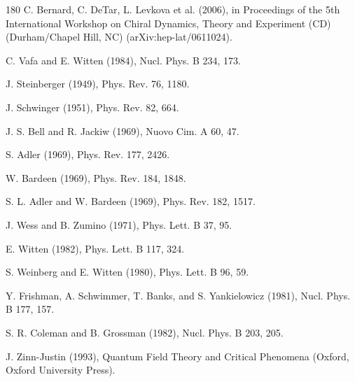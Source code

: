 \begin{thebibliography}{180}
 C. Bernard, C. DeTar, L. Levkova et al. (2006), in Proceedings of the 5th International Workshop on Chiral Dynamics, Theory and Experiment (CD) (Durham/Chapel Hill, NC) (arXiv:hep-lat/0611024).

 C. Vafa and E. Witten (1984), Nucl. Phys. B 234, 173.

 J. Steinberger (1949), Phys. Rev. 76, 1180.

 J. Schwinger (1951), Phys. Rev. 82, 664.

 J. S. Bell and R. Jackiw (1969), Nuovo Cim. A 60, 47.

 S. Adler (1969), Phys. Rev. 177, 2426.

 W. Bardeen (1969), Phys. Rev. 184, 1848.

 S. L. Adler and W. Bardeen (1969), Phys. Rev. 182, 1517.

 J. Wess and B. Zumino (1971), Phys. Lett. B 37, 95.

 E. Witten (1982), Phys. Lett. B 117, 324.

 S. Weinberg and E. Witten (1980), Phys. Lett. B 96, 59.

 Y. Frishman, A. Schwimmer, T. Banks, and S. Yankielowicz (1981), Nucl. Phys. B 177, 157.

 S. R. Coleman and B. Grossman (1982), Nucl. Phys. B 203, 205.

 J. Zinn-Justin (1993), Quantum Field Theory and Critical Phenomena (Oxford, Oxford University Press).


\end{thebibliography}
